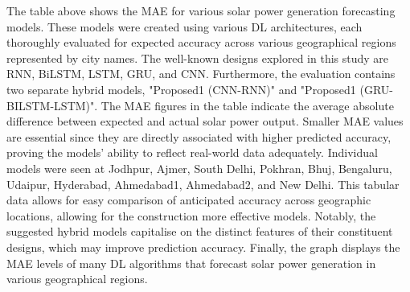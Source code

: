   The table above shows the MAE for various solar power generation forecasting models. These models were created using various DL architectures, each thoroughly evaluated for expected accuracy across various geographical regions represented by city names. The well-known designs explored in this study are RNN, BiLSTM, LSTM, GRU, and CNN. Furthermore, the evaluation contains two separate hybrid models, "Proposed1 (CNN-RNN)" and "Proposed1 (GRU-BILSTM-LSTM)". The MAE figures in the table indicate the average absolute difference between expected and actual solar power output. Smaller MAE values are essential since they are directly associated with higher predicted accuracy, proving the models' ability to reflect real-world data adequately. Individual models were seen at Jodhpur, Ajmer, South Delhi, Pokhran, Bhuj, Bengaluru, Udaipur, Hyderabad, Ahmedabad1, Ahmedabad2, and New Delhi. This tabular data allows for easy comparison of anticipated accuracy across geographic locations, allowing for the construction more effective models. Notably, the suggested hybrid models capitalise on the distinct features of their constituent designs, which may improve prediction accuracy. Finally, the graph displays the MAE levels of many DL algorithms that forecast solar power generation in various geographical regions.
  
  
  
  
  
  
  
